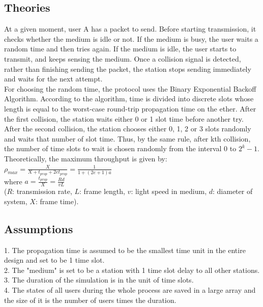 \documentclass[11pt,a4paper]{report}
\begin{document}
\subsection*{Theories}

At a given moment, user A has a packet to send. Before starting transmission, it checks whether the medium is idle or not. If the medium is busy, the user waits a random time and then tries again. If the medium is idle, the user starts to transmit, and keeps sensing the medium. Once a collision signal is detected, rather than finishing sending the packet, the station stops sending immediately and waits for the next attempt. \\

For choosing the random time, the protocol uses the Binary Exponential Backoff Algorithm. According to the algorithm, time is divided into discrete slots whose length is equal to the worst-case round-trip propagation time on the ether. After the first collision, the station waits either 0 or 1 slot time before another try. After the second collision, the station chooses either 0, 1, 2 or 3 slots randomly and waits that number of slot time. Thus, by the same rule, after kth collision, the number of time slots to wait is chosen randomly from the interval 0 to \(2^k-1\). \\

Theoretically, the maximum throughput is given by: \\

\qquad \(\rho_{max} = \frac{X}{X+t_{prop}+2et_{prop}} = \frac{1}{1+(2e+1)a}\) \\

where \(a = \frac{t_{prop}}{X} = \frac{Rd}{vL}\) \\
(\(R\): transmission rate, \(L\): frame length, \(v\): light speed in medium, \(d\): diameter of system, \(X\): frame time).

\subsection*{Assumptions}

1. The propagation time is assumed to be the smallest time unit in the entire design and set to be 1 time slot. \\
2. The "medium" is set to be a station with 1 time slot delay to all other stations. \\
3. The duration of the simulation is in the unit of time slots. \\
4. The states of all users during the whole process are saved in a large array and the size of it is the number of users times the duration.
\end{document}
